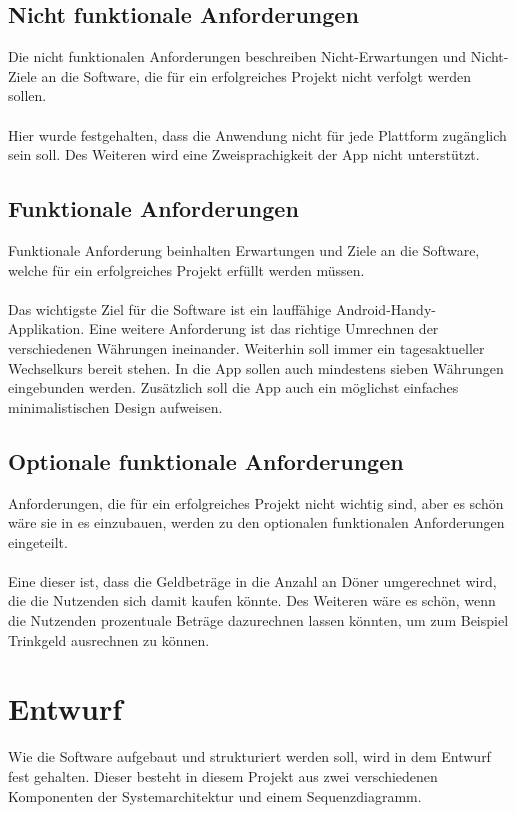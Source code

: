 \documentclass[conference]{IEEEtran}
\begin{document}
\subsection{Nicht funktionale Anforderungen}
Die nicht funktionalen Anforderungen beschreiben Nicht-Erwartungen und Nicht-Ziele an die Software, die für ein erfolgreiches Projekt nicht verfolgt werden sollen. \\\\ Hier wurde festgehalten, dass die Anwendung nicht für jede Plattform zugänglich sein soll. Des Weiteren wird eine Zweisprachigkeit der App nicht unterstützt.

\subsection{Funktionale Anforderungen}
Funktionale Anforderung beinhalten Erwartungen und Ziele an die Software, welche für ein erfolgreiches Projekt erfüllt werden müssen. \\\\ Das wichtigste Ziel für die Software ist ein lauffähige Android-Handy-Applikation. Eine weitere Anforderung ist das richtige Umrechnen der verschiedenen Währungen ineinander. Weiterhin soll immer ein tagesaktueller Wechselkurs bereit stehen. In die App sollen auch mindestens sieben Währungen eingebunden werden. Zusätzlich soll die App auch ein möglichst einfaches minimalistischen Design aufweisen. 

\subsection{Optionale funktionale Anforderungen}
Anforderungen, die für ein erfolgreiches Projekt nicht wichtig sind, aber es schön wäre sie in es einzubauen, werden zu den optionalen funktionalen Anforderungen eingeteilt. \\\\ Eine dieser ist, dass die Geldbeträge in die Anzahl an Döner umgerechnet wird, die die Nutzenden sich damit kaufen könnte. Des Weiteren wäre es schön, wenn die Nutzenden prozentuale Beträge dazurechnen lassen könnten, um zum Beispiel Trinkgeld ausrechnen zu können.

\section{Entwurf}
Wie die Software aufgebaut und strukturiert werden soll, wird in dem Entwurf fest gehalten. Dieser besteht in diesem Projekt aus zwei verschiedenen Komponenten der Systemarchitektur und einem Sequenzdiagramm. 
\end{document}
